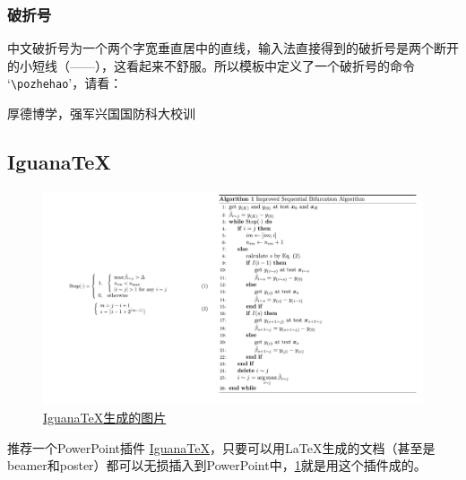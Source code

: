 \subsubsection{破折号}
中文破折号为一个两个字宽垂直居中的直线，输入法直接得到的破折号是两个断开的小短线（——），这看起来不舒服。所以模板中定义了一个破折号的命令  `\verb|\pozhehao|'，请看：

厚德博学，强军兴国\hfill \pozhehao{}国防科大校训

\subsection{Iguana\TeX{}}
\begin{figure}[htbp]
	\includegraphics[width=.8\textwidth]{image/IguanaTex.pdf}
	\caption{\href{https://github.com/Jonathan-LeRoux/IguanaTex}{Iguana\TeX{}生成的图片}}
	\label{fig:IguanaTex}
\end{figure}

推荐一个PowerPoint插件 \href{https://github.com/Jonathan-LeRoux/IguanaTex}{Iguana\TeX{}}，只要可以用\LaTeX{}生成的文档（甚至是beamer和poster）都可以无损插入到PowerPoint中，\cref{fig:IguanaTex}就是用这个插件成的。
